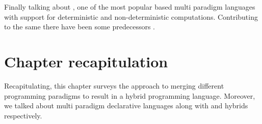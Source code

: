 \documentclass[thesis-solanki.tex]{subfiles}
\begin{document}
Finally talking about , one of the most popular  based multi paradigm languages
with support for deterministic and non-deterministic computations. Contributing to the same there have been some
predecessors \cite{website:alf,website:toy}.        


\section{Chapter recapitulation}
Recapitulating, this chapter surveys the approach to merging different programming paradigms to result in a hybrid programming language. Moreover, we talked about multi paradigm declarative languages along with  and  hybrids respectively.  


\ifMain
\begin{scope}
  \nolinenumbers
  \enotesize
  \par
  \begin{singlespace}
  \setlength{\parskip}{12pt plus 2pt minus 1pt}
  \theendnotes
  \par
  \end{singlespace}
\end{scope}
\fi
\end{document}
